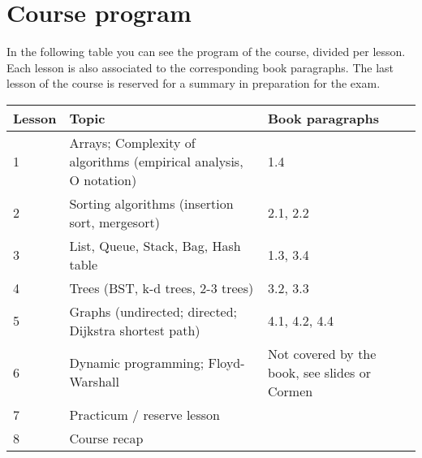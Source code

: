\section{Course program}
	
	In the following table you can see the program of the course, divided per lesson. Each lesson is also associated to the corresponding book paragraphs. The last lesson of the course is reserved for a summary in preparation for the exam. \\
	
	\begin{tabular}{ | p{1.2cm} | p{10cm} | p{3.7cm} | }
		\hline
	  	\textbf{Lesson} & \textbf{Topic} & \textbf{Book paragraphs} \\
	  	\hline
  		1 & Arrays; Complexity of algorithms (empirical analysis, O notation) & 1.4 \\
  		\hline
  		2 & Sorting algorithms (insertion sort, mergesort) & 2.1, 2.2 \\
  		\hline
  		3 & List, Queue, Stack, Bag, Hash table & 1.3, 3.4 \\
  		\hline
  		4 & Trees (BST, k-d trees, 2-3 trees) & 3.2, 3.3 \\
  		\hline
  		5 & Graphs (undirected; directed; Dijkstra shortest path) & 4.1, 4.2, 4.4 \\
  		\hline
  		6 & Dynamic programming; Floyd-Warshall & Not covered by the book, see slides or Cormen\\
  		\hline
  		7 & Practicum / reserve lesson & \\
  		\hline
  		8 & Course recap & \\
  		\hline
	\end{tabular}
\begin{comment}
  		4 & Binary search trees & 3.2 \\
  		\hline
  		5 & Balanced search trees: 2-3 search trees & 3.3 \\
  		\hline
  		6 & Graphs (undirected; directed; Dijkstra shortest path) & 4.1, 4.2, 4.4 \\
  		\hline
  		7 & Dynamic programming; Floyd-Warshall & Not covered by the book, see slides or Cormen\\
  		\hline
  		8 & Course recap & \\
  		\hline
\end{comment}
